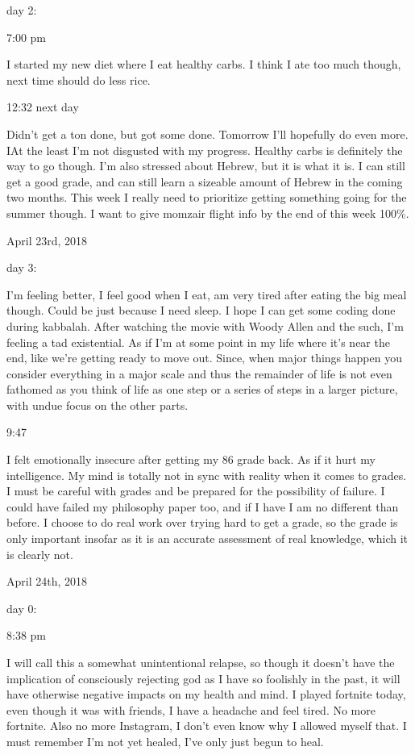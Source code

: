 day 2:

7:00 pm

I started my new diet where I eat healthy carbs. I think I ate too much
though, next time should do less rice.

12:32 next day

Didn't get a ton done, but got some done. Tomorrow I'll hopefully do
even more. IAt the least I'm not disgusted with my progress. Healthy
carbs is definitely the way to go though. I'm also stressed about
Hebrew, but it is what it is. I can still get a good grade, and can
still learn a sizeable amount of Hebrew in the coming two months. This
week I really need to prioritize getting something going for the summer
though. I want to give momzair flight info by the end of this week
100\%.

\bigskip
\bigskip
April 23rd, 2018

day 3:

I'm feeling better, I feel good when I eat, am very tired after eating
the big meal though. Could be just because I need sleep. I hope I can
get some coding done during kabbalah. After watching the movie with
Woody Allen and the such, I'm feeling a tad existential. As if I'm at
some point in my life where it's near the end, like we're getting ready
to move out. Since, when major things happen you consider everything in
a major scale and thus the remainder of life is not even fathomed as you
think of life as one step or a series of steps in a larger picture, with
undue focus on the other parts.

9:47

I felt emotionally insecure after getting my 86 grade back. As if it
hurt my intelligence. My mind is totally not in sync with reality when
it comes to grades. I must be careful with grades and be prepared for
the possibility of failure. I could have failed my philosophy paper too,
and if I have I am no different than before. I choose to do real work
over trying hard to get a grade, so the grade is only important insofar
as it is an accurate assessment of real knowledge, which it is clearly
not.

\bigskip
\bigskip
April 24th, 2018

day 0:

8:38 pm

I will call this a somewhat unintentional relapse, so though it doesn't
have the implication of consciously rejecting god as I have so foolishly
in the past, it will have otherwise negative impacts on my health and
mind. I played fortnite today, even though it was with friends, I have a
headache and feel tired. No more fortnite. Also no more Instagram, I
don't even know why I allowed myself that. I must remember I'm not yet
healed, I've only just begun to heal.

